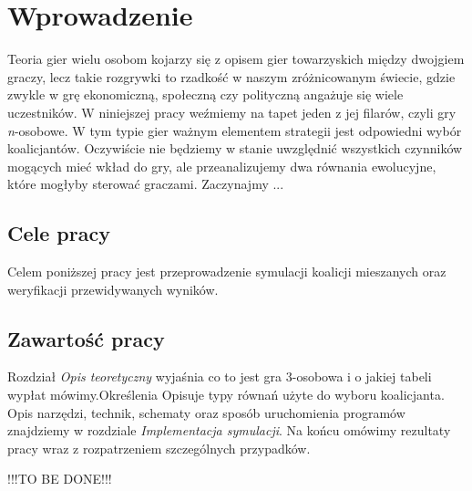 \chapter{Wprowadzenie}
\label{cha:wprowadzenie}

Teoria gier wielu osobom kojarzy się z opisem gier towarzyskich między dwojgiem graczy, lecz takie rozgrywki to rzadkość w naszym zróżnicowanym świecie, gdzie zwykle w grę ekonomiczną, społeczną czy polityczną angażuje się wiele uczestników. 
W niniejszej pracy weźmiemy na tapet jeden z jej filarów, czyli gry \textit{n}-osobowe. W tym typie gier ważnym elementem strategii jest odpowiedni wybór koalicjantów. Oczywiście nie będziemy w stanie uwzględnić wszystkich czynników mogących mieć wkład do gry, ale przeanalizujemy dwa równania ewolucyjne, które mogłyby sterować graczami. Zaczynajmy ...


\section{Cele pracy}
\label{sec:celePracy}

Celem poniższej pracy jest przeprowadzenie symulacji koalicji mieszanych oraz weryfikacji przewidywanych wyników.



\section{Zawartość pracy}
\label{sec:zawartoscPracy}
Rozdział \textit{Opis teoretyczny} wyjaśnia co to jest gra 3-osobowa i o jakiej tabeli wypłat mówimy.Określenia  Opisuje typy równań użyte do wyboru koalicjanta. Opis narzędzi, technik, schematy oraz sposób uruchomienia programów znajdziemy w rozdziale \textit{Implementacja symulacji}. Na końcu omówimy rezultaty pracy wraz z rozpatrzeniem szczególnych przypadków.

!!!TO BE DONE!!! \cite{Now06} \cite{Hof98} \cite{Str01} \cite{Qt} \cite{Tut} \cite{Sza}
